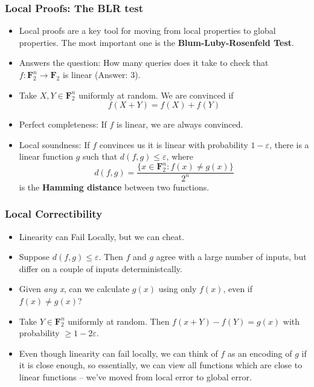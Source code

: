 \documentclass{beamer}
\begin{document}
\begin{frame}
    \frametitle{Local Proofs: The BLR test}

    \begin{itemize}
        \item<1-> Local proofs are a key tool for moving from local properties to global properties. The most important one is the {\bf Blum-Luby-Rosenfeld Test}.

        \item<2-> Answers the question: How many queries does it take to check that $f: \mathbf{F}_2^n \to \mathbf{F}_2$ is linear (Answer: 3).

        \item<3-> Take $X,Y \in \mathbf{F}_2^n$ uniformly at random. We are convinced if
        \[ f(X + Y) = f(X) + f(Y) \]

        \item<4-> Perfect completeness: If $f$ is linear, we are always convinced.
        \item<5-> Local soundness: If $f$ convinces us it is linear with probability $1 - \varepsilon$, there is a linear function $g$ such that $d(f,g) \leq \varepsilon$, where
        \[ d(f,g) = \frac{\{ x \in \mathbf{F}_2^n: f(x) \neq g(x) \}}{2^n} \]
        is the {\bf Hamming distance} between two functions.
    \end{itemize}
\end{frame}

\begin{frame}
    \frametitle{Local Correctibility}

    \begin{itemize}
        \item<1-> Linearity can Fail Locally, but we can cheat.

        \item<2-> Suppose $d(f,g) \leq \varepsilon$. Then $f$ and $g$ agree with a large number of inputs, but differ on a couple of inputs deterministcally.

        \item<3-> Given {\it any x}, can we calculate $g(x)$ using only $f(x)$, even if $f(x) \neq g(x)$?

        \item<4-> Take $Y \in \mathbf{F}_2^n$ uniformly at random. Then $f(x + Y) - f(Y) = g(x
        )$ with probability $\geq 1 - 2 \varepsilon$.

        \item<5-> Even though linearity can fail locally, we can think of $f$ as an encoding of $g$ if it is close enough, so essentially, we can view all functions which are close to linear functions -- we've moved from local error to global error.
    \end{itemize}
\end{frame}
\end{document}
